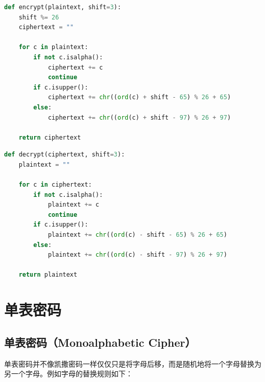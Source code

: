 
\begin{lstlisting}[language=Python]
def encrypt(plaintext, shift=3):
    shift %= 26
    ciphertext = ""

    for c in plaintext:
        if not c.isalpha():
            ciphertext += c
            continue
        if c.isupper():
            ciphertext += chr((ord(c) + shift - 65) % 26 + 65)
        else:
            ciphertext += chr((ord(c) + shift - 97) % 26 + 97)

    return ciphertext
\end{lstlisting}

\vspace{0.5cm}


\begin{lstlisting}[language=Python]
def decrypt(ciphertext, shift=3):
    plaintext = ""

    for c in ciphertext:
        if not c.isalpha():
            plaintext += c
            continue
        if c.isupper():
            plaintext += chr((ord(c) - shift - 65) % 26 + 65)
        else:
            plaintext += chr((ord(c) - shift - 97) % 26 + 97)

    return plaintext
\end{lstlisting}

\newpage

\section{单表密码}

\subsection{单表密码（Monoalphabetic Cipher）}

单表密码并不像凯撒密码一样仅仅只是将字母后移，而是随机地将一个字母替换为另一个字母。例如字母的替换规则如下：

\begin{table}[H]
    \centering
\end{table}

